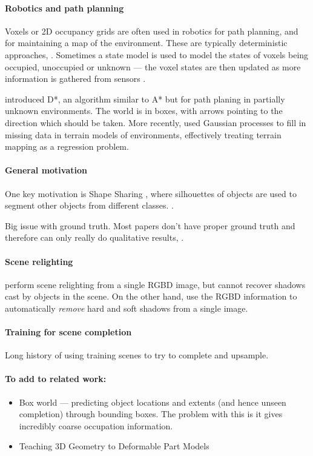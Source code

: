 \documentclass[10pt,twocolumn,letterpaper]{article}
\begin{document}
\paragraph{Robotics and path planning}
Voxels or 2D occupancy grids are often used in robotics for path planning, and for maintaining a map of the environment. 
These are typically deterministic approaches, \eg \cite{jetchev-icra-2010}. Sometimes a state model is used to model the states of voxels being occupied, unoccupied or unknown --- the voxel states are then updated as more information is gathered from sensors \cite{toussaint-techreport-2007}.

\cite{stentz-icra-1994} introduced D*, an algorithm similar to A* but for path planing in partially unknown environments. 
The world is in boxes, with arrows pointing to the direction which should be taken.
More recently, \cite{plagemann-iros-2008} used Gaussian processes to fill in missing data in terrain models of environments, effectively treating terrain mapping as a regression problem.

\paragraph{General motivation}
One key motivation is Shape Sharing \cite{kim-eccv-2012}, where silhouettes of objects are used to segment other objects from different classes.
 \cite{nan-acm-2012}.

Big issue with ground truth. Most papers don't have proper ground truth and therefore can only really do qualitative results, \eg \cite{all the papers...}.

\paragraph{Scene relighting}
\cite{ikeda-acpr-2013} perform scene relighting from a single RGBD image, but cannot recover shadows cast by objects in the scene.
On the other hand, \cite{xiao-cvpr-2014} use the RGBD information to automatically \textit{remove} hard and soft shadows from a single image.

\paragraph{Training for scene completion}
Long history of using training scenes to try to complete and upsample.

\paragraph{To add to related work:}
\begin{itemize}
\item Box world --- predicting object locations and extents (and hence unseen completion) through bounding boxes. 
The problem with this is it gives incredibly coarse occupation information.
\item Teaching 3D Geometry to Deformable Part Models
\end{itemize}
\end{document}
